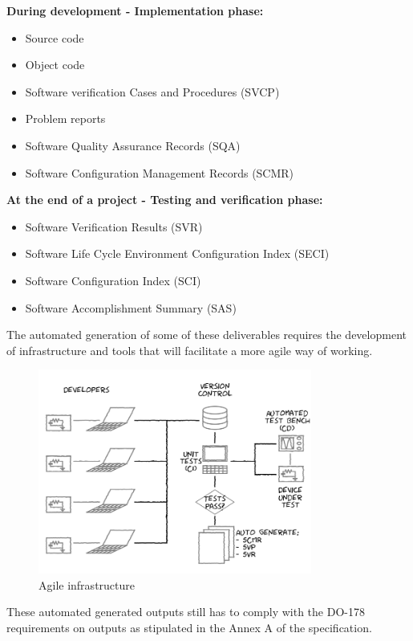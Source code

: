 \documentclass{sig-alternate-05-2015}
\begin{document}
\hfill \break
\textbf{During development - Implementation phase:}

\begin{itemize}
	\item Source code
	\item Object code
	\item Software verification Cases and Procedures (SVCP)
	\item Problem reports
	\item Software Quality Assurance Records (SQA)
	\item Software Configuration Management Records (SCMR)
\end{itemize}

\hfill \break
\textbf{At the end of a project - Testing and verification phase:}

\begin{itemize}
	\item Software Verification Results (SVR)
	\item Software Life Cycle Environment Configuration Index (SECI)
	\item Software Configuration Index (SCI)
	\item Software Accomplishment Summary (SAS)
\end{itemize} 

The automated generation of some of these deliverables requires the development of infrastructure and tools that will facilitate a more agile way of working.

\begin{figure}[t!]
	\centering 
	\includegraphics[width=90mm]{agile_setup.png}
	\caption{Agile infrastructure}
\end{figure}

These automated generated outputs still has to comply with the DO-178 requirements on outputs as stipulated in the Annex A of the specification.
\end{document}

